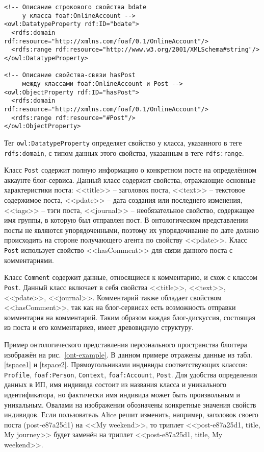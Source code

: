 {\small
\begin{verbatim}
<!-- Описание строкового свойства bdate
     у класса foaf:OnlineAccount -->
<owl:DatatypeProperty rdf:ID="bdate">
  <rdfs:domain rdf:resource="http://xmlns.com/foaf/0.1/OnlineAccount"/>
  <rdfs:range rdf:resource="http://www.w3.org/2001/XMLSchema#string"/>
</owl:DatatypeProperty>

<!-- Описание свойства-связи hasPost 
     между классами foaf:OnlineAccount и Post -->
<owl:ObjectProperty rdf:ID="hasPost">
  <rdfs:domain rdf:resource="http://xmlns.com/foaf/0.1/OnlineAccount"/>
  <rdfs:range rdf:resource="#Post"/>
</owl:ObjectProperty>
\end{verbatim}
}
Тег {\tt owl:DatatypeProperty} определяет свойство у класса, указанного в теге {\tt rdfs:domain}, с типом данных этого свойства, указанным в теге {\tt rdfs:range}.

Класс {\tt Post} содержит полную информацию о конкретном посте на определённом аккаунте блог-сервиса. Данный класс содержит свойства, отражающие основные характеристики поста: <<title>> -- заголовок поста, <<text>> -- текстовое содержимое поста, <<pdate>> -- дата создания или последнего изменения, <<tags>> -- тэги поста, <<journal>> -- необязательное свойство, содержащее имя группы, в которую был отправлен пост. В онтологическом представлении посты не являются упорядоченными, поэтому их упорядочивание по дате должно происходить на стороне получающего агента по свойству <<pdate>>. Класс {\tt Post} использует свойство <<hasComment>> для связи данного поста с комментариями.

Класс {\tt Comment} содержит данные, относящиеся к комментарию, и схож с классом {\tt Post}. Данный класс включает в себя свойства <<title>>, <<text>>, <<pdate>>, <<journal>>. Комментарий также обладает свойством <<hasComment>>, так как на блог-сервисах есть возможность отправки комментария на комментарий. Таким образом каждая блог-дискуссия, состоящая из поста и его комментариев, имеет древовидную структуру.

Пример онтологического представления персонального пространства блоггера изображён на рис.~\ref{ont-example}. В данном примере отражены данные из табл. \ref{tspace1} и \ref{tspace2}.
Прямоугольниками индивиды соответствующих классов: {\tt Profile}, {\tt foaf:Person}, {\tt Context}, {\tt foaf:Account}, {\tt Post}. Для удобства определения данных в ИП, имя индивида состоит из названия класса и уникального идентификатора, но фактически имя индивида может быть произвольным и уникальным. Овалами на изображении обозначены конкретные значения свойств индивидов. Если пользователь Alice решит изменить, например, заголовок своего поста (post-e87a25d1) на <<My weekend>>, то триплет <<post-e87a25d1, title, My journey>> будет заменён на триплет <<post-e87a25d1, title, My weekend>>.

